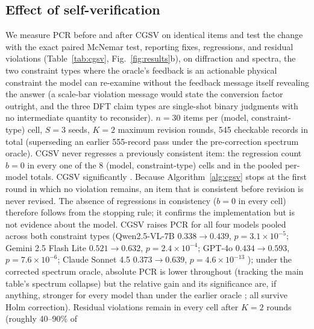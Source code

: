 \documentclass[pdflatex,sn-nature]{sn-jnl}
\newcommand{\rev}[1]{#1} %
\newcommand{\rev}[1]{{\color{blue}#1}} %
\providecommand{\DIFadd}[1]{{\protect\color{blue} \sf #1}} %
\providecommand{\DIFdel}[1]{{\protect\color{red} \scriptsize #1}} %
\providecommand{\DIFaddbegin}{} %
\providecommand{\DIFaddend}{} %
\providecommand{\DIFdelbegin}{} %
\providecommand{\DIFdelend}{} %
\providecommand{\DIFscaledelfig}{0.5}
\newlength{\DIFdelgraphicswidth} %
\newlength{\DIFdelgraphicsheight} %
\providecommand{\DIFaddincludegraphics}[2][]{{\color{blue}\fbox{\DIFOincludegraphics[#1]{#2}}}} %
\providecommand{\DIFdelincludegraphics}[2][]{%
\sbox{\DIFdelgraphicsbox}{\DIFOincludegraphics[#1]{#2}}%
\settoboxwidth{\DIFdelgraphicswidth}{\DIFdelgraphicsbox} %
\settoboxtotalheight{\DIFdelgraphicsheight}{\DIFdelgraphicsbox} %
\scalebox{\DIFscaledelfig}{%
\parbox[b]{\DIFdelgraphicswidth}{\usebox{\DIFdelgraphicsbox}\\[-\baselineskip] \rule{\DIFdelgraphicswidth}{0em}}\llap{\resizebox{\DIFdelgraphicswidth}{\DIFdelgraphicsheight}{%
\setlength{\unitlength}{\DIFdelgraphicswidth}%
\begin{picture}(1,1)%
\thicklines\linethickness{2pt} %
{\color[rgb]{1,0,0}\put(0,0){\framebox(1,1){}}}%
{\color[rgb]{1,0,0}\put(0,0){\line( 1,1){1}}}%
{\color[rgb]{1,0,0}\put(0,1){\line(1,-1){1}}}%
\end{picture}%
}\hspace*{3pt}}} %
} %
\DeclareRobustCommand{\DIFaddbegin}{\DIFOaddbegin \let\includegraphics\DIFaddincludegraphics} %
\DeclareRobustCommand{\DIFaddend}{\DIFOaddend \let\includegraphics\DIFOincludegraphics} %
\DeclareRobustCommand{\DIFdelbegin}{\DIFOdelbegin \let\includegraphics\DIFdelincludegraphics} %
\DeclareRobustCommand{\DIFdelend}{\DIFOaddend \let\includegraphics\DIFOincludegraphics} %
\begin{document}
\DIFaddend \subsection*{Effect of self-verification}
We measure PCR before and after CGSV on identical items and test the change with the
exact paired McNemar test, reporting fixes, regressions, and residual violations
(Table~\ref{tab:cgsv}, Fig.~\ref{fig:results}b), on diffraction and spectra, the two constraint types where
the oracle's feedback is an actionable physical constraint the model can re-examine
without the feedback message itself revealing the answer (a scale-bar violation
message would state the conversion factor outright, and the three DFT claim types are
single-shot binary judgments with no intermediate quantity to reconsider). $n=30$
items per (model, constraint-type) cell, $S=3$ seeds, $K=2$ maximum revision rounds, 545
checkable records in total\DIFdelbegin \DIFdel{(superseding an earlier 555-record pass under the
pre-correction spectrum oracle). CGSV never regresses a previously consistent item: the
regression count $b=0$ in every one of the 8 (model, constraint-type) cells and in the
pooled per-model totals. CGSV significantly }\DIFdelend \DIFaddbegin \DIFadd{. \rev{Because Algorithm~\ref{alg:cgsv} stops at the first round in which no
violation remains, an item that is consistent before revision is never revised. The absence of
regressions in consistency ($b=0$ in every cell) therefore follows from the stopping rule; it
confirms the implementation but is not evidence about the model.} CGSV }\DIFaddend raises PCR for all four models pooled across both
constraint types (Qwen2.5-VL-7B $0.338\!\to\!0.439$, $p=3.1\times10^{-5}$; Gemini 2.5
Flash Lite $0.521\!\to\!0.632$, $p=2.4\times10^{-4}$; GPT-4o
$0.434\!\to\!0.593$, $p=7.6\times10^{-6}$; Claude Sonnet 4.5 $0.373\!\to\!0.639$,
$p=4.6\times10^{-13}$\DIFdelbegin \DIFdel{); under the corrected spectrum oracle, absolute PCR is lower
throughout (tracking the main table's spectrum collapse) but the relative gain and its
significance are, if anything, stronger for every model than under the earlier oracle}\DIFdelend \DIFaddbegin \DIFadd{\rev{; all survive Holm correction})}\DIFaddend .
Residual violations remain in every cell after $K=2$ rounds (roughly 40--90\% of
\end{document}

